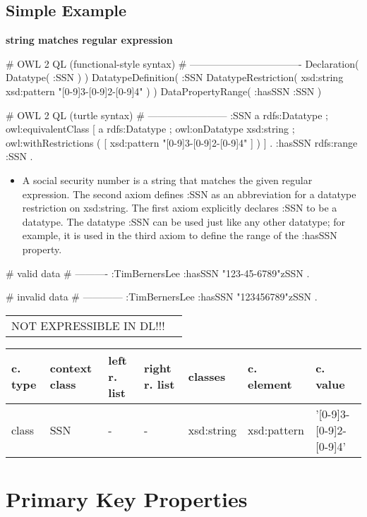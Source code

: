 \documentclass{llncs}
\newenvironment{gcotable}{
  \scriptsize
  \sffamily
  \vspace{0.3cm}
	\begin{center}
  \begin{tabular}{l|l|l|l|l|l|l}
  \hline
  \textbf{c. type} & \textbf{context class} & \textbf{left r. list} & \textbf{right r. list} & \textbf{classes} & \textbf{c. element} & \textbf{c. value} \\
  \hline

}{
  \hline
  \end{tabular}
	\end{center}
}
\newenvironment{DL}{
	\begin{center}
  \begin{tabular}{r l}

}{
  \end{tabular}
	\end{center}
}
\begin{document}
\subsection{Simple Example}

\textbf{string matches regular expression}

\begin{ex}
# OWL 2 QL (functional-style syntax)
# ----------------------------------
Declaration( Datatype( :SSN ) ) 
DatatypeDefinition( 
    :SSN
    DatatypeRestriction( xsd:string xsd:pattern "[0-9]{3}-[0-9]{2}-[0-9]{4}" ) )     
DataPropertyRange( :hasSSN :SSN ) 
\end{ex}

\begin{ex}
# OWL 2 QL (turtle syntax)
# ------------------------
:SSN 
    a rdfs:Datatype ;
    owl:equivalentClass [
        a rdfs:Datatype ;
        owl:onDatatype xsd:string ;
        owl:withRestrictions ( 
            [ xsd:pattern "[0-9]{3}-[0-9]{2}-[0-9]{4}" ] ) ] .
:hasSSN rdfs:range :SSN .
\end{ex}

\begin{itemize}
	\item A social security number is a string that matches the given regular expression. 
The second axiom defines :SSN as an abbreviation for a datatype restriction on xsd:string. 
The first axiom explicitly declares :SSN to be a datatype. 
The datatype :SSN can be used just like any other datatype; 
for example, it is used in the third axiom to define the range of the :hasSSN property. 
\end{itemize}

\begin{ex}
# valid data
# ----------
:TimBernersLee
    :hasSSN "123-45-6789"^^:SSN .
\end{ex}

\begin{ex}
# invalid data
# ------------
:TimBernersLee
    :hasSSN "123456789"^^:SSN .
\end{ex}

\begin{DL}
NOT EXPRESSIBLE IN DL!!!
\end{DL}

\begin{gcotable}
class & SSN & - & - & xsd:string & xsd:pattern & '[0-9]{3}-[0-9]{2}-[0-9]{4}' \\
\end{gcotable}

\section{Primary Key Properties}
\end{document}
